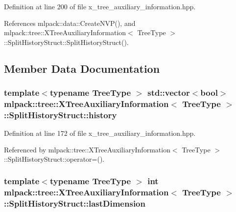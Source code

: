 Definition at line 200 of file x\+\_\+tree\+\_\+auxiliary\+\_\+information.\+hpp.



References mlpack\+::data\+::\+Create\+N\+V\+P(), and mlpack\+::tree\+::\+X\+Tree\+Auxiliary\+Information$<$ Tree\+Type $>$\+::\+Split\+History\+Struct\+::\+Split\+History\+Struct().



\subsection{Member Data Documentation}
\subsubsection[{history}]{\setlength{\rightskip}{0pt plus 5cm}template$<$typename Tree\+Type $>$ std\+::vector$<$bool$>$ {\bf mlpack\+::tree\+::\+X\+Tree\+Auxiliary\+Information}$<$ Tree\+Type $>$\+::Split\+History\+Struct\+::history}\label{structmlpack_1_1tree_1_1XTreeAuxiliaryInformation_1_1SplitHistoryStruct_a9b5345bc550e094771c1ff4bf8c68099}


Definition at line 172 of file x\+\_\+tree\+\_\+auxiliary\+\_\+information.\+hpp.



Referenced by mlpack\+::tree\+::\+X\+Tree\+Auxiliary\+Information$<$ Tree\+Type $>$\+::\+Split\+History\+Struct\+::operator=().

\subsubsection[{last\+Dimension}]{\setlength{\rightskip}{0pt plus 5cm}template$<$typename Tree\+Type $>$ int {\bf mlpack\+::tree\+::\+X\+Tree\+Auxiliary\+Information}$<$ Tree\+Type $>$\+::Split\+History\+Struct\+::last\+Dimension}\label{structmlpack_1_1tree_1_1XTreeAuxiliaryInformation_1_1SplitHistoryStruct_aeff3f4ca9542e1845c3a75950061dd74}


